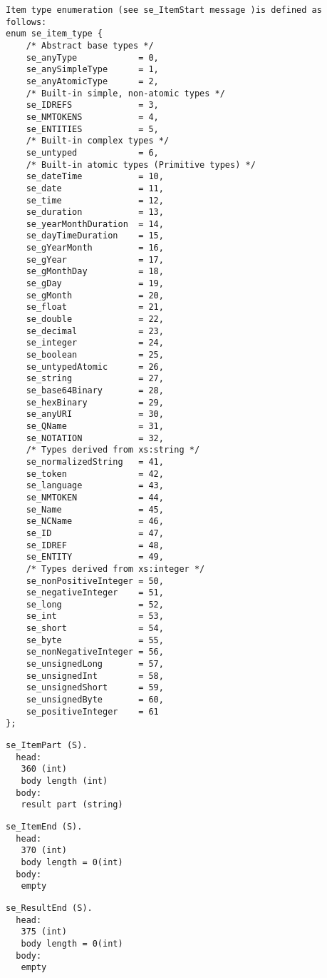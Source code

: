 \documentclass[a4paper,12pt]{article}
\begin{document}
\begin{verbatim}
Item type enumeration (see se_ItemStart message )is defined as follows:
enum se_item_type {
    /* Abstract base types */
    se_anyType            = 0,
    se_anySimpleType      = 1,
    se_anyAtomicType      = 2,
    /* Built-in simple, non-atomic types */
    se_IDREFS             = 3,
    se_NMTOKENS           = 4,
    se_ENTITIES           = 5,
    /* Built-in complex types */
    se_untyped            = 6,
    /* Built-in atomic types (Primitive types) */
    se_dateTime           = 10,
    se_date               = 11,
    se_time               = 12,
    se_duration           = 13,
    se_yearMonthDuration  = 14,
    se_dayTimeDuration    = 15,
    se_gYearMonth         = 16,
    se_gYear              = 17,
    se_gMonthDay          = 18,
    se_gDay               = 19,
    se_gMonth             = 20,
    se_float              = 21,
    se_double             = 22,
    se_decimal            = 23,
    se_integer            = 24,
    se_boolean            = 25,
    se_untypedAtomic      = 26,
    se_string             = 27,
    se_base64Binary       = 28,
    se_hexBinary          = 29,
    se_anyURI             = 30,
    se_QName              = 31,
    se_NOTATION           = 32,
    /* Types derived from xs:string */
    se_normalizedString   = 41,
    se_token              = 42,
    se_language           = 43,
    se_NMTOKEN            = 44,
    se_Name               = 45,
    se_NCName             = 46,
    se_ID                 = 47,
    se_IDREF              = 48,
    se_ENTITY             = 49,
    /* Types derived from xs:integer */
    se_nonPositiveInteger = 50,
    se_negativeInteger    = 51,
    se_long               = 52,
    se_int                = 53,
    se_short              = 54,
    se_byte               = 55,
    se_nonNegativeInteger = 56,
    se_unsignedLong       = 57,
    se_unsignedInt        = 58,
    se_unsignedShort      = 59,
    se_unsignedByte       = 60,
    se_positiveInteger    = 61
};
\end{verbatim}

\begin{verbatim}
se_ItemPart (S).
  head:
   360 (int)
   body length (int)
  body:
   result part (string)
\end{verbatim}

\begin{verbatim}
se_ItemEnd (S).
  head:
   370 (int)
   body length = 0(int)
  body:
   empty
\end{verbatim}

\begin{verbatim}
se_ResultEnd (S).
  head:
   375 (int)
   body length = 0(int)
  body:
   empty
\end{verbatim}
\end{document}
